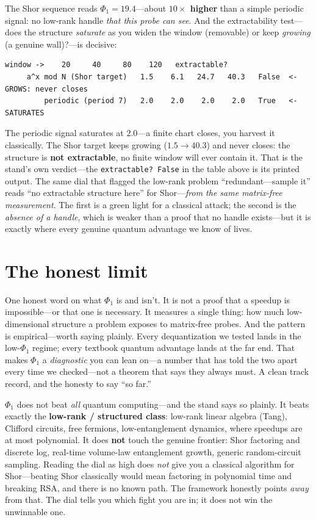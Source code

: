 \documentclass[11pt]{article}
\newcommand{\Phione}{$\Phi_1$}
\begin{document}
The Shor sequence reads \textbf{$\Phi_1 = 19.4$}---about \textbf{$10\times$ higher}
than a simple periodic signal: no low-rank handle \emph{that this probe can see}.
And the extractability test---does the structure
\emph{saturate} as you widen the window (removable) or keep \emph{growing} (a
genuine wall)?---is decisive:

\begin{Verbatim}[fontsize=\small]
                    window ->    20     40     80    120   extractable?
     a^x mod N (Shor target)   1.5    6.1   24.7   40.3   False  <- GROWS: never closes
         periodic (period 7)   2.0    2.0    2.0    2.0   True   <- SATURATES
\end{Verbatim}

The periodic signal saturates at $2.0$---a finite chart closes, you harvest it
classically. The Shor target keeps growing ($1.5 \to 40.3$) and never closes: the
structure is \textbf{not extractable}, no finite window will ever contain it. That
is the stand's own verdict---the \texttt{extractable?\ False} in the table above is
its printed output. The same dial that flagged the low-rank problem
``redundant---sample it'' reads ``no extractable structure here'' for
Shor---\emph{from the same matrix-free measurement}. The first is a green light for
a classical attack; the second is the \emph{absence of a handle}, which is weaker
than a proof that no handle exists---but it is exactly where every genuine quantum
advantage we know of lives.

\section*{The honest limit}

One honest word on what \Phione{} is and isn't. It is not a proof that a speedup is
impossible---or that one is necessary. It measures a single thing: how much
low-dimensional structure a problem exposes to matrix-free probes. And the pattern
is empirical---worth saying plainly. Every dequantization we tested lands in the
low-\Phione{} regime; every textbook quantum advantage lands at the far end. That
makes \Phione{} a \emph{diagnostic} you can lean on---a number that has told the two
apart every time we checked---not a theorem that says they always must. A clean
track record, and the honesty to say ``so far.''

\Phione{} does not beat \emph{all} quantum computing---and the stand says so plainly.
It beats exactly the \textbf{low-rank / structured class}: low-rank linear algebra
(Tang), Clifford circuits, free fermions, low-entanglement dynamics, where
speedups are at most polynomial. It does \textbf{not} touch the genuine frontier:
Shor factoring and discrete log, real-time volume-law entanglement growth, generic
random-circuit sampling. Reading the dial as high does \emph{not} give you a
classical algorithm for Shor---beating Shor classically would mean factoring in
polynomial time and breaking RSA, and there is no known path. The framework
honestly points \emph{away} from that. The dial tells you which fight you are in;
it does not win the unwinnable one.
\end{document}
